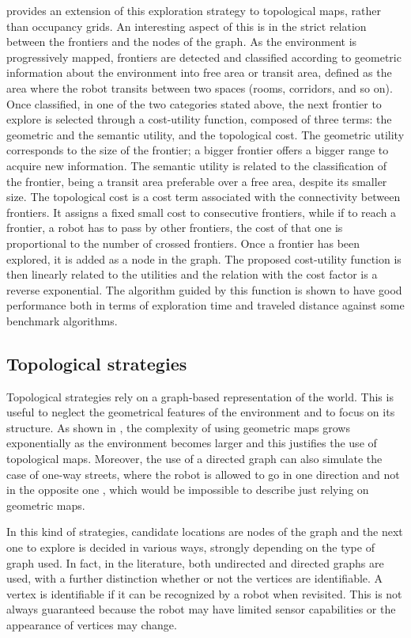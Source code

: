 \cite{Gomez2019} provides an extension of this exploration strategy
to topological maps, rather than occupancy grids. An interesting aspect
of this is in the strict relation between the frontiers and the nodes
of the graph\emph{. }As the environment is progressively mapped, frontiers
are detected and classified according to geometric information about
the environment into free area or transit area, defined as the area
where the robot transits between two spaces (rooms, corridors, and
so on). Once classified, in one of the two categories stated above,
the next frontier to explore is selected through a cost-utility function,
composed of three terms: the geometric and the semantic utility, and
the topological cost. The geometric utility corresponds to the size
of the frontier; a bigger frontier offers a bigger range to acquire
new information. The semantic utility is related to the classification
of the frontier, being a transit area preferable over a free area,
despite its smaller size. The topological cost is a cost term associated
with the connectivity between frontiers. It assigns a fixed small
cost to consecutive frontiers, while if to reach a frontier, a robot
has to pass by other frontiers, the cost of that one is proportional
to the number of crossed frontiers. Once a frontier has been explored,
it is added as a node in the graph. The proposed cost-utility function
is then linearly related to the utilities and the relation with the
cost factor is a reverse exponential. The algorithm guided by this
function is shown to have good performance both in terms of exploration
time and traveled distance against some benchmark algorithms. 

\subsection{Topological strategies}

Topological strategies rely on a graph-based representation of the
world. This is useful to neglect the geometrical features of the environment
and to focus on its structure. As shown in \cite{Chatila},
the complexity of using geometric maps grows exponentially as the
environment becomes larger and this justifies the use of topological
maps. Moreover, the use of a directed graph can also simulate the
case of one-way streets, where the robot is allowed to go in one direction
and not in the opposite one \cite{Bender}, which would be impossible
to describe just relying on geometric maps. 

In this kind of strategies, candidate locations are nodes of the graph
and the next one to explore is decided in various ways, strongly depending
on the type of graph used. In fact, in the literature, both undirected
and directed graphs are used, with a further distinction whether or
not the vertices are identifiable. A vertex is identifiable if it
can be recognized by a robot when revisited. This is not always guaranteed
because the robot may have limited sensor capabilities or the appearance
of vertices may change. 

